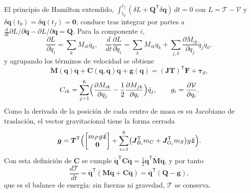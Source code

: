 \documentclass[conference]{IEEEtran}
\newcommand{\vect}[1]{\bm{#1}}
\newcommand{\T}{^{\mathsf{T}}}
\begin{document}
El principio de Hamilton extendido, $\int_{t_0}^{t_f}(\delta L + \vect Q\T\delta\vect q)\,dt = 0$ con $L = \mathcal T - \mathcal V$ y $\delta\vect q(t_0) = \delta\vect q(t_f) = \vect 0$, conduce tras integrar por partes a $\frac{d}{dt}\partial L/\partial\dot{\vect q} - \partial L/\partial\vect q = \vect Q$. Para la componente $i$,
\begin{equation*}
\frac{\partial L}{\partial\dot q_i} = \sum_kM_{ik}\dot q_k,\quad
\frac{d}{dt}\frac{\partial L}{\partial\dot q_i} = \sum_kM_{ik}\ddot q_k + \sum_{j,k}\frac{\partial M_{ik}}{\partial q_j}\dot q_j\dot q_k ,
\end{equation*}
y agrupando los términos de velocidad se obtiene
\begin{equation}
\vect M(\vect q)\ddot{\vect q} + \vect C(\vect q, \dot{\vect q})\dot{\vect q} + \vect g(\vect q) = (\vect J\vect T)\T\vect F + \vect\tau_d ,
\label{eq:dyn}
\end{equation}
\begin{equation}
C_{ik} = \sum_{j=1}^6\Bigl(\frac{\partial M_{ik}}{\partial q_j} - \frac12\frac{\partial M_{jk}}{\partial q_i}\Bigr)\dot q_j,\qquad g_i = \frac{\partial\mathcal V}{\partial q_i}.
\end{equation}
Como la derivada de la posición de cada centro de masa es su Jacobiano de traslación, el vector gravitacional tiene la forma cerrada
\begin{equation}
\vect g = \vect T\T\Bigl(\begin{bmatrix}m_Pg\hat{\vect z}\\ \vect 0\end{bmatrix} + \sum_{i=1}^6\bigl(\vect J_{B_i}\T m_C + \vect J_{G_i}\T m_S\bigr)g\hat{\vect z}\Bigr).
\label{eq:g}
\end{equation}
Con esta definición de $\vect C$ se cumple $\dot{\vect q}\T\vect C\dot{\vect q} = \frac12\dot{\vect q}\T\dot{\vect M}\dot{\vect q}$, y por tanto
\begin{equation}
\frac{d\mathcal T}{dt} = \dot{\vect q}\T(\vect M\ddot{\vect q} + \vect C\dot{\vect q}) = \dot{\vect q}\T(\vect Q - \vect g),
\end{equation}
que es el balance de energía: sin fuerzas ni gravedad, $\mathcal T$ se conserva.
\end{document}
